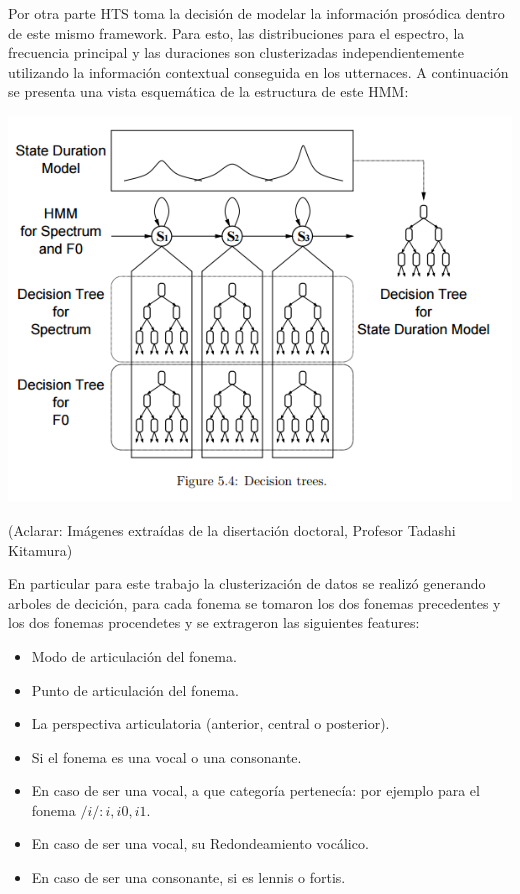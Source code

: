 Por otra parte HTS toma la decisión de modelar la información prosódica dentro de este mismo framework. Para esto, las distribuciones para el espectro, la frecuencia principal y las duraciones son clusterizadas independientemente utilizando la información contextual conseguida en los utternaces. A continuación se presenta una vista esquemática de la estructura de este HMM:

\includegraphics[scale=0.5]{imagenes/hmmContext.png}

(Aclarar: Imágenes extraídas de la disertación doctoral, Profesor Tadashi Kitamura)

En particular para este trabajo la clusterización de datos se realizó generando arboles de decición, para cada fonema se tomaron los dos fonemas precedentes y los dos fonemas procendetes y se extrageron las siguientes features:

\begin{itemize}
\item Modo de articulación del fonema.
\item Punto de articulación del fonema.
\item La perspectiva articulatoria (anterior, central o posterior).
\item Si el fonema es una vocal o una consonante.
\item En caso de ser una vocal, a que categoría pertenecía: por ejemplo para el fonema $/i/: {i, i0,i1}$.
\item En caso de ser una vocal, su Redondeamiento vocálico.
\item En caso de ser una consonante, si es lennis o fortis.
\end{itemize}


